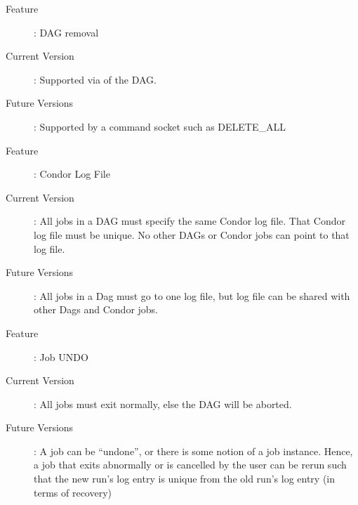 \begin{description}
\item[Feature]: DAG removal
\item[Current Version]: Supported via  of the DAG.
\item[Future Versions]: Supported by a command socket such as DELETE\_ALL
\end{description}

\begin{description}
\item[Feature]: Condor Log File
\item[Current Version]: All jobs in a DAG must specify the same Condor log
file.  That Condor log file must be unique.  No other DAGs or Condor jobs can
point to that log file.
\item[Future Versions]: All jobs in a Dag must go to one log file, but
log file can be shared with other Dags and Condor jobs.
\end{description}

\begin{description}
\item[Feature]: Job UNDO
\item[Current Version]: All jobs must exit normally, else the DAG will be
aborted.
\item[Future Versions]: A job can be ``undone'', or there is some
notion of a job instance.  Hence, a job that exits abnormally or is
cancelled by the user can be rerun such that the new run's log entry
is unique from the old run's log entry (in terms of recovery)
\end{description}
